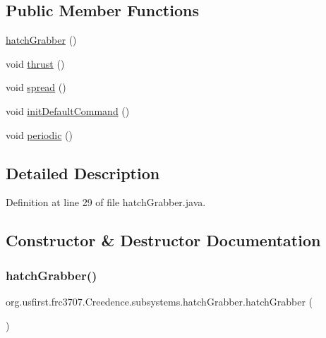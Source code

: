 \subsection*{Public Member Functions}
\begin{DoxyCompactItemize}
\item 
\mbox{\hyperlink{classorg_1_1usfirst_1_1frc3707_1_1_creedence_1_1subsystems_1_1hatch_grabber_a428efd90a19e73baf4691225159ac6ea}{hatch\+Grabber}} ()
\item 
void \mbox{\hyperlink{classorg_1_1usfirst_1_1frc3707_1_1_creedence_1_1subsystems_1_1hatch_grabber_a150bc67ff17ba2055df49e773dc941a0}{thrust}} ()
\item 
void \mbox{\hyperlink{classorg_1_1usfirst_1_1frc3707_1_1_creedence_1_1subsystems_1_1hatch_grabber_acf96dcaf3a80776bfdcad24ea771003e}{spread}} ()
\item 
void \mbox{\hyperlink{classorg_1_1usfirst_1_1frc3707_1_1_creedence_1_1subsystems_1_1hatch_grabber_ae46ee89f92d8b86f8069ea0da7240d06}{init\+Default\+Command}} ()
\item 
void \mbox{\hyperlink{classorg_1_1usfirst_1_1frc3707_1_1_creedence_1_1subsystems_1_1hatch_grabber_ac668d8174967c4a1197609fd83e1db46}{periodic}} ()
\end{DoxyCompactItemize}


\subsection{Detailed Description}


Definition at line 29 of file hatch\+Grabber.\+java.



\subsection{Constructor \& Destructor Documentation}
\mbox{\label{classorg_1_1usfirst_1_1frc3707_1_1_creedence_1_1subsystems_1_1hatch_grabber_a428efd90a19e73baf4691225159ac6ea}} 
\subsubsection{\texorpdfstring{hatchGrabber()}{hatchGrabber()}}
{\footnotesize\ttfamily org.\+usfirst.\+frc3707.\+Creedence.\+subsystems.\+hatch\+Grabber.\+hatch\+Grabber (\begin{DoxyParamCaption}{ }\end{DoxyParamCaption})}



